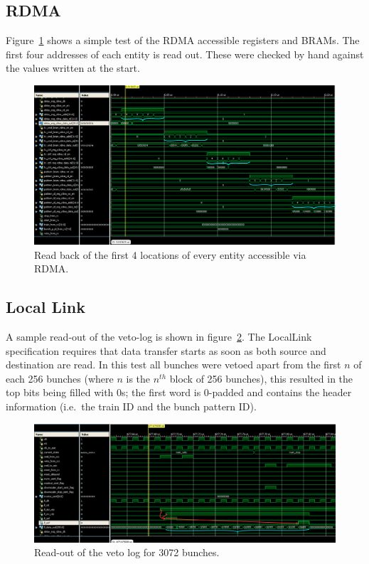 \subsection{RDMA} %
\label{sec:rdma}
Figure~\ref{fig:isim_rdma} shows a simple test of the RDMA accessible registers and BRAMs. The first four addresses of each entity is read out. These were checked by hand against the values written at the start.
\begin{figure}
  \centering
  \includegraphics[width=\textwidth]{images/isim/edited/rdma.png}
  \caption{Read back of the first 4 locations of every entity accessible via RDMA.}
  \label{fig:isim_rdma}
\end{figure}
    
\clearpage
\subsection{Local Link} %
\label{sec:local_link}
A sample read-out of the veto-log is shown in figure~\ref{fig:isim_locallink}. The LocalLink specification requires that data transfer starts as soon as both source and destination are read. In this test all bunches were vetoed apart from the first \(n\) of each 256 bunches (where \( n\) is the \( n^{th} \) block of 256 bunches), this resulted in the top bits being filled with 0s; the first word is 0-padded and contains the header information (i.e.\ the train ID and the bunch pattern ID).
\begin{figure}
  \centering
  \includegraphics[width=\textwidth]{images/isim/edited/locallink.png}
  \caption{Read-out of the veto log for 3072 bunches.}
  \label{fig:isim_locallink}
\end{figure}
    
